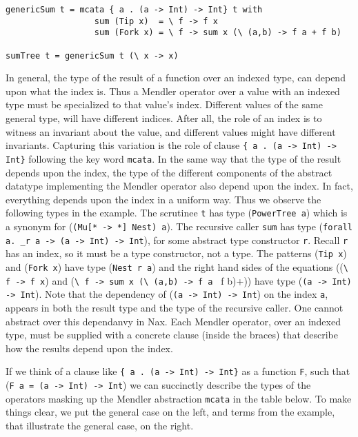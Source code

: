 {\small
\begin{verbatim}
genericSum t = mcata { a . (a -> Int) -> Int} t with
                  sum (Tip x)  = \ f -> f x
                  sum (Fork x) = \ f -> sum x (\ (a,b) -> f a + f b)

sumTree t = genericSum t (\ x -> x)
\end{verbatim}

In general, the type of the result of a function over an indexed type,
can depend upon what the index is. Thus a Mendler operator over a value
with an indexed
type must be specialized to that value's index. Different values of the
same general type, will have different indices. After all, the role of
an index is to witness an invariant about the value, and different
values might have different invariants. Capturing this variation is the role of clause
\verb+{ a . (a -> Int) -> Int}+ following the key word \verb+mcata+. In
the same way that the type of the result depends upon the index, the type of
the different components of the abstract datatype implementing the Mendler
operator also depend upon the index. In fact, everything depends upon the index
in a uniform way. Thus we observe the following types in the example.
The scrutinee \verb+t+ has type (\verb+PowerTree a+) which is a synonym for
(\verb+(Mu[* -> *] Nest) a+). The recursive caller
\verb+sum+ has type (\verb+forall a. _r a -> (a -> Int) -> Int+), for some abstract
type constructor \verb+r+. Recall \verb+r+ has an index, so it must be a type constructor, not a type. 
The patterns (\verb+Tip x+) and (\verb+Fork x+) have type
(\verb+Nest r a+) and the right hand sides of the equations
((\verb+\ f -> f x+) and (\verb+\ f -> sum x (\ (a,b) -> f a + f b)+)) have type
(\verb+(a -> Int) -> Int+). Note that the dependency of (\verb+(a -> Int) -> Int+) on
the index \verb+a+, appears in both the result type and the type of the recursive caller.
One cannot abstract over this dependanvy in Nax. Each Mendler operator, over
an indexed type, must be supplied with a concrete clause (inside the braces)
that describe how the results depend upon the index. 

If we think of a clause like \verb+{ a . (a -> Int) -> Int}+ as a function \verb+F+,
such that (\verb+F a = (a -> Int) -> Int+) we can succinctly
describe the types of the operators masking up the Mendler abstraction \verb+mcata+
in the table below. To make things clear, we put the general case on the left, and
terms from the example, that illustrate the general case, on the right.

}
